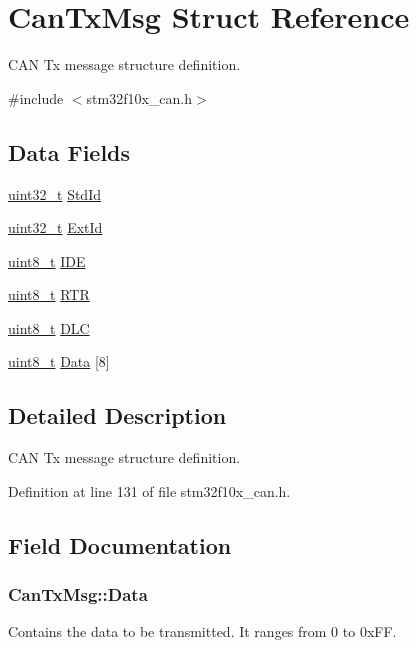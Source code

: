 \hypertarget{struct_can_tx_msg}{\section{Can\-Tx\-Msg Struct Reference}
\label{struct_can_tx_msg}
}


C\-A\-N Tx message structure definition.  




{\ttfamily \#include $<$stm32f10x\-\_\-can.\-h$>$}

\subsection*{Data Fields}
\begin{DoxyCompactItemize}
\item 
\hyperlink{stdint_8h_a435d1572bf3f880d55459d9805097f62}{uint32\-\_\-t} \hyperlink{struct_can_tx_msg_abfb50c8208227f8cf378f29cf9a3a6f3}{Std\-Id}
\item 
\hyperlink{stdint_8h_a435d1572bf3f880d55459d9805097f62}{uint32\-\_\-t} \hyperlink{struct_can_tx_msg_a33050a95a4cc463b589ff16bdd416f22}{Ext\-Id}
\item 
\hyperlink{stdint_8h_aba7bc1797add20fe3efdf37ced1182c5}{uint8\-\_\-t} \hyperlink{struct_can_tx_msg_aa4c8568a0e3250a17bd7e116b3e09670}{I\-D\-E}
\item 
\hyperlink{stdint_8h_aba7bc1797add20fe3efdf37ced1182c5}{uint8\-\_\-t} \hyperlink{struct_can_tx_msg_a69f84255db38c6910058f290efdb7302}{R\-T\-R}
\item 
\hyperlink{stdint_8h_aba7bc1797add20fe3efdf37ced1182c5}{uint8\-\_\-t} \hyperlink{struct_can_tx_msg_ab49d0fa602aad2fd9cd007adafc11fc2}{D\-L\-C}
\item 
\hyperlink{stdint_8h_aba7bc1797add20fe3efdf37ced1182c5}{uint8\-\_\-t} \hyperlink{struct_can_tx_msg_a1cc34ae87bf2e3b19b2e6860f7015ebd}{Data} \mbox{[}8\mbox{]}
\end{DoxyCompactItemize}


\subsection{Detailed Description}
C\-A\-N Tx message structure definition. 

Definition at line 131 of file stm32f10x\-\_\-can.\-h.



\subsection{Field Documentation}
\hypertarget{struct_can_tx_msg_a1cc34ae87bf2e3b19b2e6860f7015ebd}{
\subsubsection[{Data}]{ Can\-Tx\-Msg\-::\-Data}}\label{struct_can_tx_msg_a1cc34ae87bf2e3b19b2e6860f7015ebd}
Contains the data to be transmitted. It ranges from 0 to 0x\-F\-F. 


